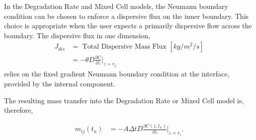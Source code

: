 
In the Degradation Rate and Mixed Cell models, the Neumann boundary condition 
can be chosen to enforce a dispersive flux on the inner boundary. This choice 
is appropriate when the user expects a primarily dispersive flow across the 
boundary.
The dispersive flux in one dimension, 
\begin{align}
      J_{dis} &= \mbox{ Total Dispersive Mass Flux }[kg/m^2/s]\nonumber\\
      &= -\theta D\frac{\partial C}{\partial z}\Big|_{z=r_j} \nonumber
\end{align}
relies on the fixed gradient Neumann boundary condition at the interface, 
provided by the internal component. 

The resulting mass transfer into the Degradation Rate or Mixed Cell model is, 
therefore, 

\begin{align}
m_{ij}(t_n) &= - A\Delta t D \frac{\partial C(z,t_n)}{\partial z}|_{z=r_i}.
\end{align}
